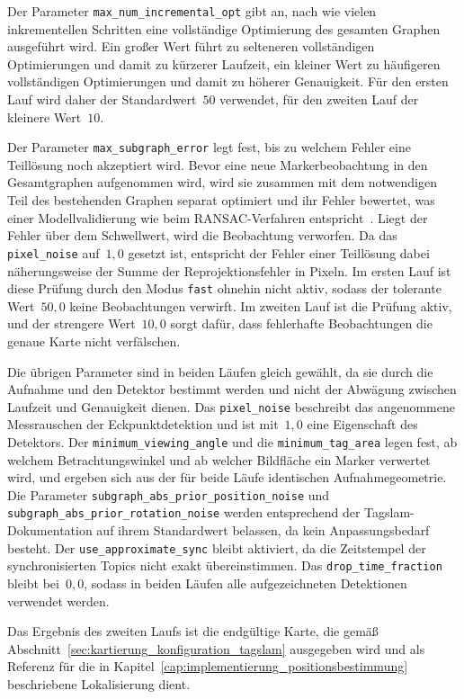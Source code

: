 Der Parameter \texttt{max\_num\_incremental\_opt} gibt an, nach wie vielen inkrementellen Schritten eine vollständige Optimierung des gesamten Graphen ausgeführt wird.
Ein großer Wert führt zu selteneren vollständigen Optimierungen und damit zu kürzerer Laufzeit, ein kleiner Wert zu häufigeren vollständigen Optimierungen und damit zu höherer Genauigkeit.
Für den ersten Lauf wird daher der Standardwert~$50$ verwendet, für den zweiten Lauf der kleinere Wert~$10$.

Der Parameter \texttt{max\_subgraph\_error} legt fest, bis zu welchem Fehler eine Teillösung noch akzeptiert wird.
Bevor eine neue Markerbeobachtung in den Gesamtgraphen aufgenommen wird, wird sie zusammen mit dem notwendigen Teil des bestehenden Graphen separat optimiert und ihr Fehler bewertet, was einer Modellvalidierung wie beim RANSAC-Verfahren entspricht~\cite{pfrommer2019tagslam}.
Liegt der Fehler über dem Schwellwert, wird die Beobachtung verworfen.
Da das \texttt{pixel\_noise} auf~$1{,}0$ gesetzt ist, entspricht der Fehler einer Teillösung dabei näherungsweise der Summe der Reprojektionsfehler in Pixeln.
Im ersten Lauf ist diese Prüfung durch den Modus \texttt{fast} ohnehin nicht aktiv, sodass der tolerante Wert~$50{,}0$ keine Beobachtungen verwirft.
Im zweiten Lauf ist die Prüfung aktiv, und der strengere Wert~$10{,}0$ sorgt dafür, dass fehlerhafte Beobachtungen die genaue Karte nicht verfälschen.

Die übrigen Parameter sind in beiden Läufen gleich gewählt, da sie durch die Aufnahme und den Detektor bestimmt werden und nicht der Abwägung zwischen Laufzeit und Genauigkeit dienen.
Das \texttt{pixel\_noise} beschreibt das angenommene Messrauschen der Eckpunktdetektion und ist mit~$1{,}0$ eine Eigenschaft des Detektors.
Der \texttt{minimum\_viewing\_angle} und die \texttt{minimum\_tag\_area} legen fest, ab welchem Betrachtungswinkel und ab welcher Bildfläche ein Marker verwertet wird, und ergeben sich aus der für beide Läufe identischen Aufnahmegeometrie.
Die Parameter \texttt{subgraph\_abs\_prior\_position\_noise} und \texttt{subgraph\_abs\_prior\_rotation\_noise} werden entsprechend der Tag\gls{slam}-Dokumentation auf ihrem Standardwert belassen, da kein Anpassungsbedarf besteht.
Der \texttt{use\_approximate\_sync} bleibt aktiviert, da die Zeitstempel der synchronisierten Topics nicht exakt übereinstimmen.
Das \texttt{drop\_time\_fraction} bleibt bei~$0{,}0$, sodass in beiden Läufen alle aufgezeichneten Detektionen verwendet werden.

Das Ergebnis des zweiten Laufs ist die endgültige Karte, die gemäß Abschnitt~\ref{sec:kartierung_konfiguration_tagslam} ausgegeben wird und als Referenz für die in Kapitel~\ref{cap:implementierung_positionsbestimmung} beschriebene Lokalisierung dient.




